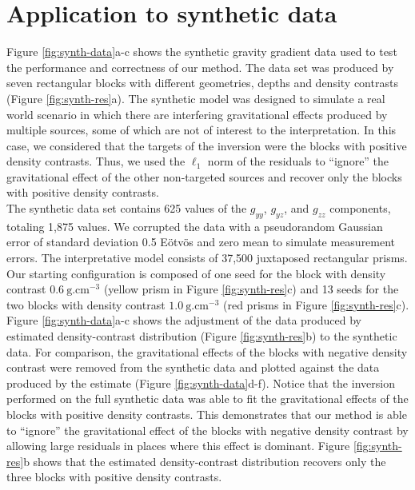 \documentclass{segabs}
\begin{document}
\vspace{-0.4cm}
\section{Application to synthetic data}

Figure \ref{fig:synth-data}a-c shows the synthetic gravity gradient data used to test the
performance and correctness of our method.
The data set was produced by seven rectangular blocks with different geometries, depths
and density contrasts (Figure \ref{fig:synth-res}a).
The synthetic model was designed to simulate a real world scenario in which there
are interfering gravitational effects produced by multiple sources, some of which are not of
interest to the interpretation.
In this case, we considered that the targets of the inversion were the blocks with positive
density contrasts.
Thus, we used the $\ell_1$ norm of the residuals to ``ignore'' the gravitational effect of
the other non-targeted sources and recover only the blocks with positive density contrasts.
\\[0.2cm]
The synthetic data set contains 625 values of the $g_{yy}$, $g_{yz}$, and $g_{zz}$
components, totaling 1,875 values. We corrupted the data with a pseudorandom Gaussian error of
standard deviation 0.5 E\"otv\"os and zero mean to simulate measurement errors.
The interpretative model consists of 37,500 juxtaposed rectangular prisms.
Our starting configuration is composed of one seed for the block with density contrast
$0.6\ \text{g.cm}^{-3}$ (yellow prism in Figure \ref{fig:synth-res}c) and 13 seeds for the
two blocks with density contrast $1.0\ \text{g.cm}^{-3}$ (red prisms in
Figure \ref{fig:synth-res}c).
\\[0.2cm]
Figure \ref{fig:synth-data}a-c shows the adjustment of the data produced by estimated
density-contrast distribution (Figure \ref{fig:synth-res}b) to the synthetic data.
For comparison, the gravitational effects of the blocks with negative density contrast were
removed from the synthetic data and plotted against the data produced by the estimate
(Figure \ref{fig:synth-data}d-f).
Notice that the inversion performed on the full synthetic data was able to fit the
gravitational effects of the blocks with positive density contrasts.
This demonstrates that our method is able to ``ignore'' the
gravitational effect of the blocks with negative density contrast
by allowing large residuals in places where this effect is dominant.
Figure \ref{fig:synth-res}b shows that the estimated density-contrast distribution recovers
only the three blocks with positive density contrasts.
\end{document}
